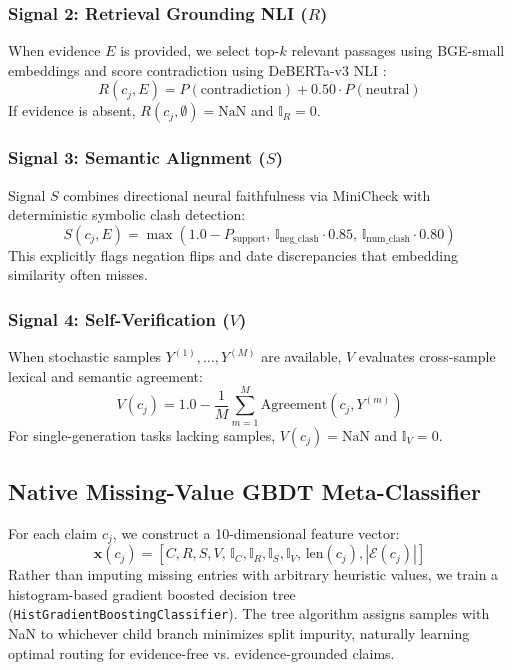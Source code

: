\documentclass[conference]{IEEEtran}
\begin{document}
\subsubsection{Signal 2: Retrieval Grounding NLI ($R$)}
When evidence $E$ is provided, we select top-$k$ relevant passages using BGE-small embeddings \cite{b14_bge} and score contradiction using DeBERTa-v3 NLI \cite{b20_deberta}:
\begin{equation}
    R(c_j, E) = P(\text{contradiction}) + 0.50 \cdot P(\text{neutral})
\end{equation}
If evidence is absent, $R(c_j, \emptyset) = \text{NaN}$ and $\mathbb{I}_R = 0$.

\subsubsection{Signal 3: Semantic Alignment ($S$)}
Signal $S$ combines directional neural faithfulness via MiniCheck \cite{b22_minicheck} with deterministic symbolic clash detection:
\begin{equation}
    S(c_j, E) = \max\left(1.0 - P_{\text{support}}, \, \mathbb{I}_{\text{neg\_clash}} \cdot 0.85, \, \mathbb{I}_{\text{num\_clash}} \cdot 0.80\right)
\end{equation}
This explicitly flags negation flips and date discrepancies that embedding similarity often misses.

\subsubsection{Signal 4: Self-Verification ($V$)}
When stochastic samples $Y^{(1)}, \dots, Y^{(M)}$ are available, $V$ evaluates cross-sample lexical and semantic agreement:
\begin{equation}
    V(c_j) = 1.0 - \frac{1}{M}\sum_{m=1}^M \text{Agreement}(c_j, Y^{(m)})
\end{equation}
For single-generation tasks lacking samples, $V(c_j) = \text{NaN}$ and $\mathbb{I}_V = 0$.

\subsection{Native Missing-Value GBDT Meta-Classifier}
For each claim $c_j$, we construct a 10-dimensional feature vector:
\begin{equation}
    \mathbf{x}(c_j) = \left[ C, R, S, V, \, \mathbb{I}_C, \mathbb{I}_R, \mathbb{I}_S, \mathbb{I}_V, \, \text{len}(c_j), |\mathcal{E}(c_j)| \right]
\end{equation}
Rather than imputing missing entries with arbitrary heuristic values, we train a histogram-based gradient boosted decision tree (\texttt{HistGradientBoostingClassifier}). The tree algorithm assigns samples with NaN to whichever child branch minimizes split impurity, naturally learning optimal routing for evidence-free vs. evidence-grounded claims.
\end{document}
